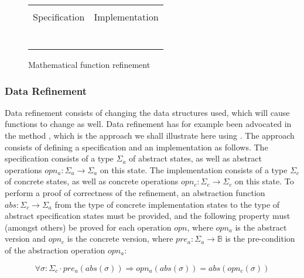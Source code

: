 \begin{figure}
  \centering
  \begin{tabular}[c]{c|c}
    \hline \\
    Specification & Implementation \\
    \hline\hline \\ \\
    \begin{subfigure}[c]{0.5\textwidth}
     
      \label{fig:prepost1}
    \end{subfigure}
    &
    \begin{subfigure}[c]{0.5\textwidth}
      
      \label{fig:prepost2}
    \end{subfigure}
    \\ \\
    \hline
  \end{tabular}    
  \caption{Mathematical function refinement}
  \label{fig:prepost}
\end{figure}

\subsubsection{Data Refinement}

Data refinement consists of changing the data structures used, which will
cause functions to change as well. Data refinement has for example been
advocated in the \vdm{} method \cite{vdm}, which is the approach we shall
illustrate here using \Klang. The approach consists of defining a specification 
and an implementation as follows. The specification consists of a type
$\Sigma_a$ of abstract states, as well as abstract operations $opn_a : \Sigma_a 
\rightarrow \Sigma_a$ on this state. The implementation consists of a type
$\Sigma_c$ of concrete states, as well as concrete operations $opn_c : \Sigma_c 
\rightarrow \Sigma_c$ on this state. To perform a proof of correctness of the 
refinement, an abstraction function $abs : \Sigma_c \rightarrow \Sigma_a$ from 
the type of concrete implementation states to the type of abstract specification 
states must be provided, and the following property must (amongst others) 
be proved for each operation $opn$, where $opn_a$ is the abstract version and $opn_c$ is the concrete version, where $pre_a : \Sigma_a \rightarrow \mathbb{B}$
is the pre-condition of the abstraction operation $opn_a$:

\begin{equation} \label{eq:refinement}
\forall \sigma : \Sigma_c \cdot 
  pre_a(abs(\sigma)) \Rightarrow opn_a(abs(\sigma)) = abs(opn_c(\sigma))
\end{equation}

